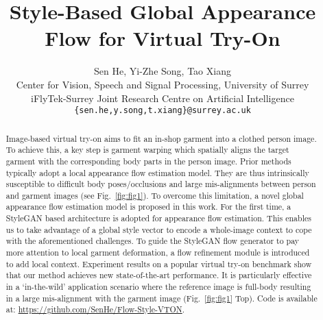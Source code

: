 \documentclass[10pt,twocolumn,letterpaper]{article}
\begin{document}
\title{Style-Based Global Appearance Flow for Virtual Try-On}



\author{Sen He, Yi-Zhe Song, Tao Xiang\\
Center for Vision, Speech and Signal Processing, University of Surrey\\ iFlyTek-Surrey Joint Research Centre on Artificial Intelligence\\
{\tt\small \{sen.he,y.song,t.xiang\}@surrey.ac.uk}
}


\maketitle

\begin{abstract}
   Image-based virtual try-on aims to fit an in-shop garment into a clothed person image. To achieve this, a key step is garment warping which spatially aligns the target garment with the corresponding body parts in the person image.  Prior  methods typically adopt a local appearance flow estimation model. They are thus intrinsically susceptible to difficult body poses/occlusions and large mis-alignments between person and garment images (see Fig.~\ref{fig:fig1}). To overcome this limitation, a novel global appearance flow estimation model is proposed in this work. For the first time, a StyleGAN based architecture is adopted for appearance flow estimation. This enables us to take advantage of a global style vector to encode a whole-image context to cope with the aforementioned challenges. To guide the StyleGAN flow generator to pay more attention to local garment deformation, a flow refinement module is introduced to add local context. 
Experiment results on a popular virtual try-on benchmark show that our method achieves new state-of-the-art performance. It is particularly effective in a `in-the-wild' application scenario where the reference image is full-body resulting in a large mis-alignment with the garment image (Fig.~\ref{fig:fig1} Top). Code is available at: \url{https://github.com/SenHe/Flow-Style-VTON}.\vspace{-0.4cm}
\end{abstract}
\end{document}
